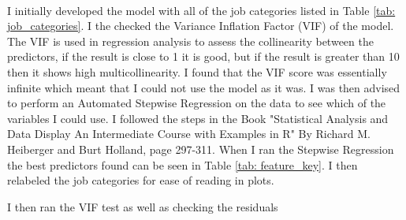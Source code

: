 \documentclass{article}
\begin{document}
\paragraph{}I initially developed the model with all of the job categories listed in Table \ref{tab: job_categories}. I the checked the Variance Inflation Factor (VIF) of the model. The VIF is used in regression analysis to assess the collinearity between the predictors, if the result is close to 1 it is good, but if the result is greater than 10 then it shows high multicollinearity. I found that the VIF score was essentially infinite which meant that I could not use the model as it was. I was then advised to perform an Automated Stepwise Regression on the data to see which of the variables I could use. I followed the steps in the Book "Statistical Analysis and Data Display An Intermediate Course with Examples in R" By Richard M. Heiberger and Burt Holland, page 297-311. When I ran the Stepwise Regression the best predictors found can be seen in Table \ref{tab: feature_key}. I then relabeled the job categories for ease of reading in plots.

\begin{table}[H]
    \centering
    \caption{Feature Key Table}
    \label{tab: feature_key}
\end{table}

I then ran the VIF test as well as checking the residuals
\end{document}
